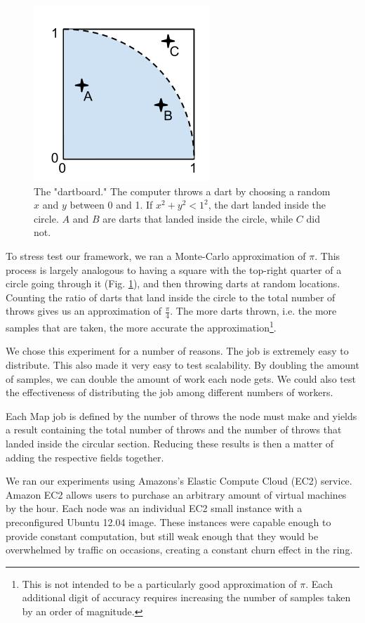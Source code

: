 \begin{figure}
	\centering
	\includegraphics[width=0.40\linewidth]{figs/dartboard}
	\caption[ChordReduce $\pi$ dartboard]{The "dartboard." The computer throws a dart by choosing a random $x$ and $y$ between 0 and 1.  If $x^{2} + y^{2} < 1^{2} $, the dart landed inside the circle.  $A$ and $B$ are darts that landed inside the circle, while $C$ did not.}
	\label{fig:dartboard}
\end{figure}

To stress test our framework, we ran a Monte-Carlo approximation of $\pi$. This process is largely analogous to having a square with the top-right quarter of a circle going through it (Fig. \ref{fig:dartboard}), and then throwing darts at random locations.  Counting the ratio of darts that land inside the circle to the total number of throws gives us an approximation of $\frac{\pi}{4}$.  The more darts thrown, i.e. the more samples that are taken, the more accurate the approximation\footnote{This is not intended to be a particularly good approximation of $\pi$. Each additional digit of accuracy requires increasing the number of samples taken by an order of magnitude.}.

We chose this experiment for a number of reasons. The job is extremely easy to distribute.  This also made it very easy to test scalability. By doubling the amount of samples, we can double the amount of work each node gets.  We could also test the effectiveness of distributing the job among different numbers of workers.

Each Map job is defined by the number of throws the node must make and yields a result containing the total number of throws and the number of throws that landed inside the circular section.  Reducing these results is then a matter of adding the respective fields together. 

We ran our experiments using Amazons's Elastic Compute Cloud (EC2) service.  Amazon EC2 allows users to purchase an arbitrary amount of virtual machines by the hour. Each node was an individual EC2 small instance \cite{amazon-instances} with a preconfigured Ubuntu 12.04 image.  These instances were capable enough to provide constant computation, but still weak enough that they would be overwhelmed by traffic on occasions, creating a constant churn effect in the ring.  

